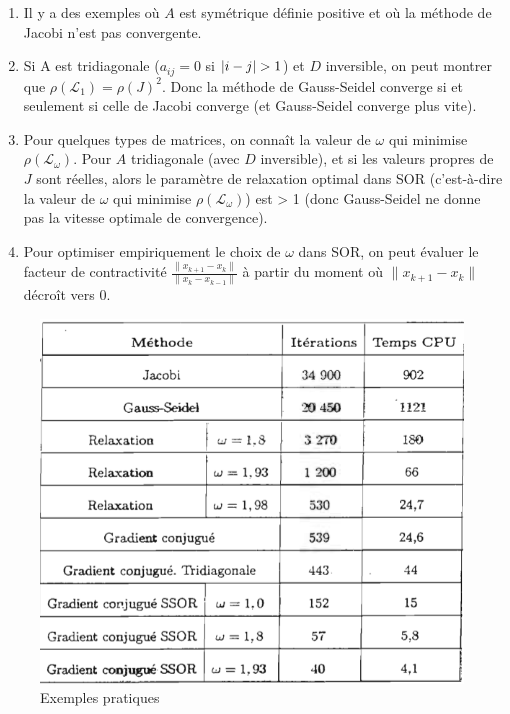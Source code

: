 \begin{remark}
    \begin{enumerate}
        \item Il y a des exemples où $A$ est symétrique définie positive et où la méthode de Jacobi n'est pas convergente.
        \item Si A est tridiagonale ($a_{ij}=0$ si $\left\lvert i-j\right\rvert>1$) et $D$ inversible, on peut montrer que $\rho(\mathcal{L}_1)=\rho(J)^2$. Donc la méthode de Gauss-Seidel converge si et seulement si celle de Jacobi converge (et Gauss-Seidel converge plus vite).
        \item  Pour quelques types de matrices, on connaît la valeur de $\omega$ qui minimise $\rho (\mathcal{L}_{\omega})$.
            Pour $A$ tridiagonale (avec $D$ inversible), et si les valeurs propres de $J$ sont réelles, alors le paramètre de relaxation optimal dans SOR (c'est-à-dire la valeur de $\omega$ qui minimise $\rho (\mathcal{L}_{\omega})$) est > 1 (donc Gauss-Seidel ne donne pas la vitesse optimale de convergence).
        \item Pour optimiser empiriquement le choix de $\omega$ dans SOR, on peut évaluer le facteur de contractivité $\frac{\| x_{k+1} - x_k\|}{\| x_k - x_{k-1}\|}$ à partir du moment où $\|x_{k+1}-x_{k}\|$ décroît vers 0.
    \end{enumerate}
\end{remark}

\begin{figure}[h]
    \centering
    \includegraphics[scale=0.5]{tableau.png}
    \caption{Exemples pratiques}
    \label{fig:tableau}
\end{figure}

